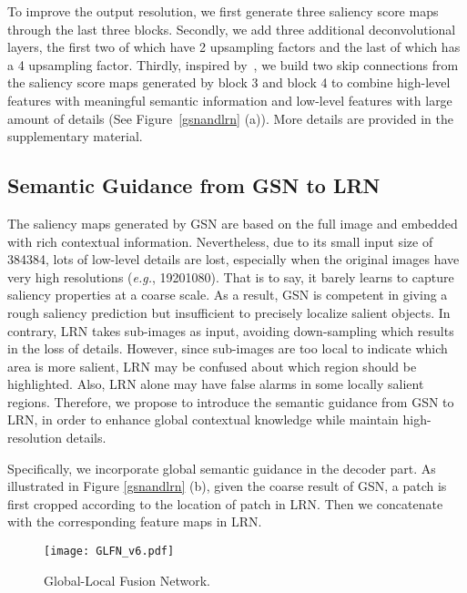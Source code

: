 \documentclass[10pt,twocolumn,letterpaper]{article}
\begin{document}
To improve the output resolution, we first generate three saliency score maps through the last three blocks. Secondly, we add three additional deconvolutional layers, the first two of which have 2{} upsampling factors and the last of which has a 4{} upsampling factor. Thirdly, inspired by~\cite{long2015fully}, we build two skip connections from the saliency score maps generated by block 3 and block 4 to combine high-level features with meaningful semantic information and low-level features with large amount of details (See Figure~\ref{gsnandlrn} (a)). More details are provided in the supplementary material.

\subsection{Semantic Guidance from GSN to LRN} \label{42}

The saliency maps generated by GSN are based on the full image and embedded with rich contextual information. Nevertheless, due to its small input size of 384{}384, lots of low-level details are lost, especially when the original images have very high resolutions (\emph{e.g.}, 1920{}1080). That is to say, it barely learns to capture saliency properties at a coarse scale. As a result, GSN is competent in giving a rough saliency prediction but insufficient to precisely localize salient objects. In contrary, LRN takes sub-images as input, avoiding down-sampling which results in the loss of details. However, since sub-images are too local to indicate which area is more salient, LRN may be confused about which region should be highlighted. Also, LRN alone may have false alarms in some locally salient regions. Therefore, we propose to introduce the semantic guidance from GSN to LRN, in order to enhance global contextual knowledge while maintain high-resolution details.

Specifically, we incorporate global semantic guidance
in the decoder part. As illustrated in Figure \ref{gsnandlrn} (b), given the coarse result  of GSN, a patch  is first cropped according to the location of
patch  in LRN. Then we concatenate  with the corresponding feature maps in LRN.
\begin{figure*}[!t]
  \vspace{-3mm}
  \centering
\texttt{[image: GLFN\_v6.pdf]}\\
  \caption{Global-Local Fusion Network.}\label{glfn}
  \vspace{-4mm}
\end{figure*}
\end{document}
